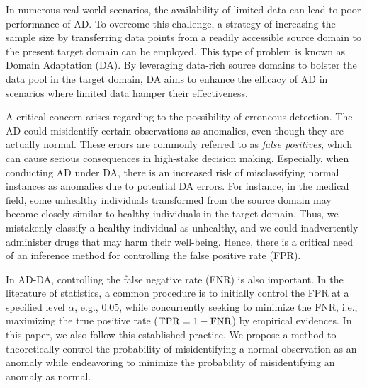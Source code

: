 In numerous real-world scenarios, the availability of limited data can lead to poor performance of AD. 
%
To overcome this challenge, a strategy of increasing the sample size by transferring data points from a readily accessible source domain to the present target domain can be employed. 
%
This type of problem is known as Domain Adaptation (DA).
%
By leveraging data-rich source domains to bolster the data pool in the target domain, DA aims to enhance the efficacy of AD in scenarios where limited data hamper their effectiveness.



A critical concern arises regarding to the possibility of erroneous detection.
%
The AD could misidentify certain observations as anomalies, even though they are actually normal. 
%
These errors are commonly referred to as \emph{false positives},
%
which can cause serious consequences in high-stake decision making.
%
Especially, when conducting AD under DA, there is an increased risk of misclassifying normal instances as anomalies due to potential DA errors.
%
%
For instance, in the medical field, some unhealthy individuals transformed from the source domain may become closely similar to healthy individuals in the target domain.
%
Thus, we mistakenly classify a healthy individual as unhealthy, and we could inadvertently administer drugs that may harm their well-being. 
%
%
%
Hence, there is a critical need of an inference method  for controlling the false positive rate (FPR).


In AD-DA, controlling the false negative rate (FNR) is also important.
%
In the literature of statistics, a common procedure is to initially control the FPR at a specified level $\alpha$, e.g., 0.05, while concurrently seeking to minimize the FNR, i.e., maximizing the true positive rate (${\rm TPR} = 1 - {\rm FNR}$)
by empirical evidences.
%
In this paper, we also follow this established practice.
%
We propose a method to theoretically control the probability of misidentifying a normal observation as an anomaly while endeavoring to minimize the probability of misidentifying an anomaly as normal.




